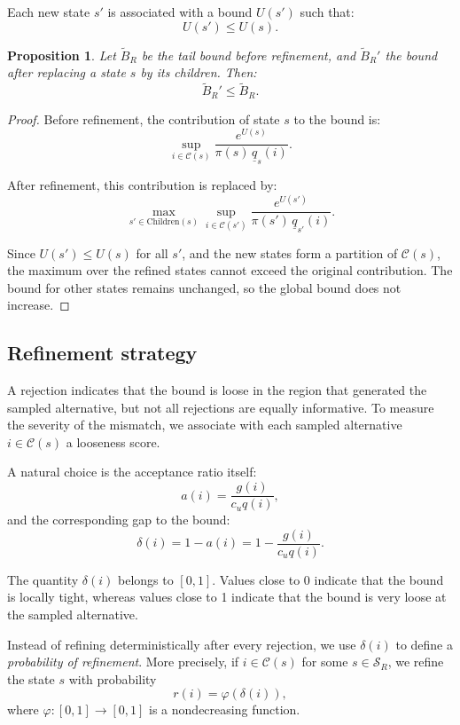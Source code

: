 \documentclass[11pt]{article}
\newtheorem{proposition}{Proposition}
\begin{document}
Each new state $s'$ is associated with a bound $U(s')$ such that:
\[
U(s') \le U(s).
\]

\begin{proposition}
Let $\widetilde{B}_R$ be the tail bound before refinement, and $\widetilde{B}_R'$ the bound after replacing a state $s$ by its children. Then:
\[
\widetilde{B}_R' \le \widetilde{B}_R.
\]
\end{proposition}

\begin{proof}
Before refinement, the contribution of state $s$ to the bound is:
\[
\sup_{i \in \mathcal{C}(s)} \frac{e^{U(s)}}{\pi(s)\,\underline{q}_s(i)}.
\]

After refinement, this contribution is replaced by:
\[
\max_{s' \in \text{Children}(s)} \sup_{i \in \mathcal{C}(s')} \frac{e^{U(s')}}{\pi(s')\,\underline{q}_{s'}(i)}.
\]

Since $U(s') \le U(s)$ for all $s'$, and the new states form a partition of $\mathcal{C}(s)$, the maximum over the refined states cannot exceed the original contribution. The bound for other states remains unchanged, so the global bound does not increase.
\end{proof}

\subsection{Refinement strategy}

A rejection indicates that the bound is loose in the region that generated the sampled alternative, but not all rejections are equally informative. To measure the severity of the mismatch, we associate with each sampled alternative $i \in \mathcal{C}(s)$ a looseness score.

A natural choice is the acceptance ratio itself:
\[
a(i) = \frac{g(i)}{c_u q(i)},
\]
and the corresponding gap to the bound:
\[
\delta(i) = 1 - a(i) = 1 - \frac{g(i)}{c_u q(i)}.
\]

The quantity $\delta(i)$ belongs to $[0,1]$. Values close to 0 indicate that the bound is locally tight, whereas values close to 1 indicate that the bound is very loose at the sampled alternative.

Instead of refining deterministically after every rejection, we use $\delta(i)$ to define a \emph{probability of refinement}. More precisely, if $i \in \mathcal{C}(s)$ for some $s \in \mathcal{S}_R$, we refine the state $s$ with probability
\[
r(i) = \varphi(\delta(i)),
\]
where $\varphi : [0,1] \to [0,1]$ is a nondecreasing function.
\end{document}

